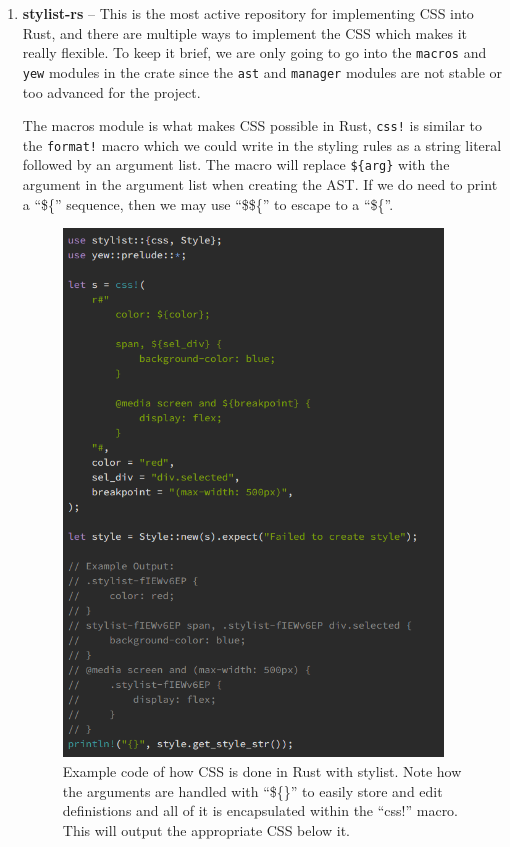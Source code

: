\documentclass[
    paper=letter,
    parskip=half,
    fontsize=12pt,
    titlepage=firstiscover,
    toc=bibliography,
    numbers=endperiod
]{scrartcl}
\begin{document}
\begin{enumerate}
    \item
          \textbf{stylist-rs} -- This is the most active repository for
          implementing CSS into Rust, and there are multiple ways to implement
          the CSS which makes it really flexible. To keep it brief, we are
          only going to go into the \texttt{macros} and \texttt{yew} modules
          in the crate since the \texttt{ast} and \texttt{manager} modules are
          not stable or too advanced for the project.

          The macros module \cite{stylist-macros} is what makes CSS possible in
          Rust, \texttt{css!} is similar to the \texttt{format!} macro which we
          could write in the styling rules as a string literal followed by an
          argument list. The macro will replace \texttt{\$\{arg\}} with the
          argument in the argument list when creating the AST. If we do need to
          print a ``\$\{'' sequence, then we may use ``\$\$\{'' to escape to a
          ``\$\{''.

          \begin{figure}[H]
              \includegraphics[height=14cm]{stylist-rust-example}
              \caption{Example code of how CSS is done in Rust with stylist. Note how the arguments are handled with ``\$\{\}'' to easily store and edit definistions and all of it is encapsulated within the ``css!'' macro. This will output the appropriate CSS below it.}
          \end{figure}


\end{enumerate}
\end{document}
